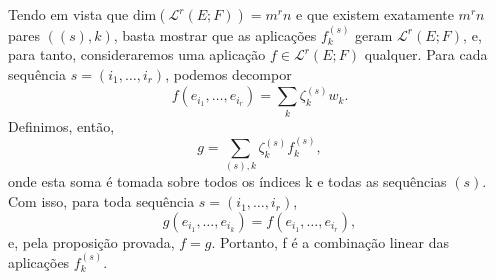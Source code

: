 \documentclass[../differential_forms.tex]{subfiles}
\begin{document}
\begin{proof*}
	Tendo em vista que \(\mathrm{dim}(\mathcal{L}^{r}(E; F))=m^{r}n\) e que existem exatamente \(m^{r}n\) pares \(((s), k)\), basta mostrar que as aplicações \(f_{k}^{(s)}\) geram \(\mathcal{L}^{r}(E; F)\), e, para tanto, consideraremos uma aplicação \(f\in \mathcal{L}^{r}(E; F)\) qualquer. Para cada sequência \(s=(i_{1}, \dotsc , i_{r})\), podemos decompor
	\[
		f(e_{i_1},\dotsc , e_{i_r})=\sum\limits_{k}^{}\zeta_{k}^{(s)}w_{k}.
	\]
	Definimos, então,
	\[
		g = \sum\limits_{(s), k}^{}\zeta_{k}^{(s)}f_{k}^{(s)},
	\]
	onde esta soma é tomada sobre todos os índices k e todas as sequências \((s)\). Com isso, para toda sequência \(s=(i_1,\dotsc ,i_{r})\),
	\[
		g(e_{i_1},\dotsc , e_{i_k})=f(e_{i_1},\dotsc , e_{i_r}),
	\]
	e, pela proposição provada, \(f=g\). Portanto, f é a combinação linear das aplicações \(f_{k}^{(s)}.\) \qedsymbol
\end{proof*}
\end{document}
